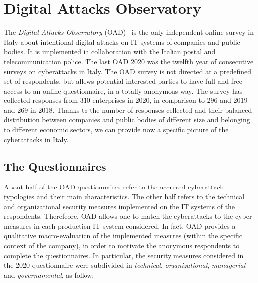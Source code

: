 \documentclass{easychair}
\begin{document}
\section{Digital Attacks Observatory}\label{sec:DigitalAttacksObservatory}

The \textit{Digital Attacks Observatory} (OAD)~\cite{oadweb} is the only independent online survey in Italy about intentional digital attacks on IT systems of companies and public
bodies. It is implemented in collaboration with the Italian postal and telecommunication police.
The last OAD 2020 was the twelfth year of consecutive surveys on cyberattacks in Italy.
The OAD survey is not directed at a predefined set of respondents, but allows potential interested
parties to have full and free access to an online questionnaire, in a totally anonymous way.
The survey has collected responses from 310 enterprises in 2020, in comparison
to 296 and 2019 and 269 in 2018.
Thanks to the number of responses collected and their balanced distribution between companies and public bodies of different size and belonging to different economic
sectors, we can provide now a specific picture of the cyberattacks in Italy.

\subsection{The Questionnaires}

About half of the OAD questionnaires refer to the occurred
cyberattack typologies and their main characteristics.
The other half refers to the technical and organizational security measures implemented
on the IT systems of the respondents. 
Therefeore, OAD allows one to match the cyberattacks to the cyber-measures in each production
IT system considered. 
In fact, OAD provides a qualitative macro-evaluation of the implemented measures
(within the specific context of the company), in order to motivate the anonymous respondents
to complete the questionnaires.
In particular, the security measures considered in the 2020 questionnaire were subdivided
in \emph{technical}, \emph{organizational}, \emph{managerial} and \emph{governamental}, as follow:
\end{document}
